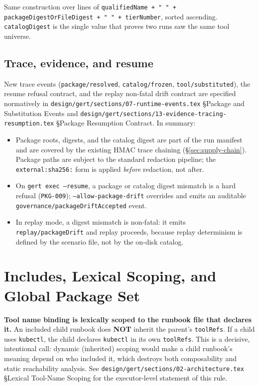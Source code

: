 Same construction over lines of
\texttt{qualifiedName + "  " + packageDigestOrFileDigest + "  " + tierNumber},
sorted ascending. \texttt{catalogDigest} is the single value that proves two
runs saw the same tool universe.

\subsection{Trace, evidence, and resume}

New trace events (\texttt{package/resolved}, \texttt{catalog/frozen},
\texttt{tool/substituted}), the resume refusal contract, and the replay
non-fatal drift contract are specified normatively in
\texttt{design/gert/sections/07-runtime-events.tex}
\S Package and Substitution Events and
\texttt{design/gert/sections/13-evidence-tracing-resumption.tex}
\S Package Resumption Contract. In summary:

\begin{itemize}
  \item Package roots, digests, and the catalog digest are part of the run
        manifest and are covered by the existing HMAC trace chaining
        (\S\ref{sec:supply-chain}). Package paths are subject to the
        standard redaction pipeline; the \texttt{external:sha256:} form is
        applied \emph{before} redaction, not after.
  \item On \texttt{gert exec --resume}, a package or catalog digest mismatch
        is a hard refusal (\texttt{PKG-009}); \texttt{--allow-package-drift}
        overrides and emits an auditable
        \texttt{governance/packageDriftAccepted} event.
  \item In replay mode, a digest mismatch is non-fatal: it emits
        \texttt{replay/packageDrift} and replay proceeds, because replay
        determinism is defined by the scenario file, not by the on-disk
        catalog.
\end{itemize}

\section{Includes, Lexical Scoping, and Global Package Set}
\label{sec:tool-packages-includes}

\textbf{Tool name binding is lexically scoped to the runbook file that
declares it.} An included child runbook does \textbf{NOT} inherit the
parent's \texttt{toolRefs}. If a child uses \texttt{kubectl}, the child
declares \texttt{kubectl} in its own \texttt{toolRefs}. This is a decisive,
intentional call: dynamic (inherited) scoping would make a child runbook's
meaning depend on who included it, which destroys both composability and
static reachability analysis. See
\texttt{design/gert/sections/02-architecture.tex}
\S Lexical Tool-Name Scoping for the executor-level statement of this rule.


